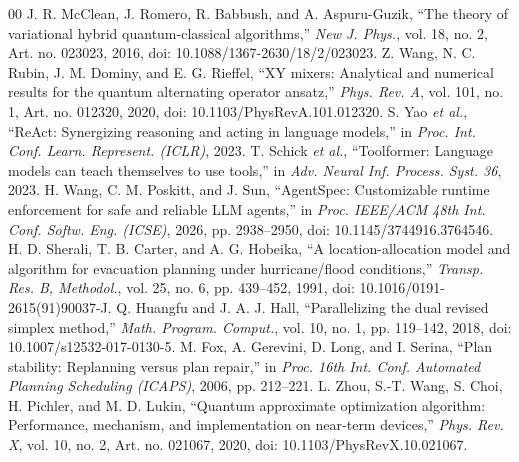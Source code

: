 \documentclass[conference]{IEEEtran}
\begin{document}
\begin{thebibliography}{00}
 J. R. McClean, J. Romero, R. Babbush, and A. Aspuru-Guzik, ``The theory of variational hybrid quantum-classical algorithms,'' \textit{New J. Phys.}, vol. 18, no. 2, Art. no. 023023, 2016, doi: 10.1088/1367-2630/18/2/023023.
 Z. Wang, N. C. Rubin, J. M. Dominy, and E. G. Rieffel, ``XY mixers: Analytical and numerical results for the quantum alternating operator ansatz,'' \textit{Phys. Rev. A}, vol. 101, no. 1, Art. no. 012320, 2020, doi: 10.1103/PhysRevA.101.012320.
 S. Yao \textit{et al.}, ``ReAct: Synergizing reasoning and acting in language models,'' in \textit{Proc. Int. Conf. Learn. Represent. (ICLR)}, 2023.
 T. Schick \textit{et al.}, ``Toolformer: Language models can teach themselves to use tools,'' in \textit{Adv. Neural Inf. Process. Syst. 36}, 2023.
 H. Wang, C. M. Poskitt, and J. Sun, ``AgentSpec: Customizable runtime enforcement for safe and reliable LLM agents,'' in \textit{Proc. IEEE/ACM 48th Int. Conf. Softw. Eng. (ICSE)}, 2026, pp. 2938--2950, doi: 10.1145/3744916.3764546.
 H. D. Sherali, T. B. Carter, and A. G. Hobeika, ``A location-allocation model and algorithm for evacuation planning under hurricane/flood conditions,'' \textit{Transp. Res. B, Methodol.}, vol. 25, no. 6, pp. 439--452, 1991, doi: 10.1016/0191-2615(91)90037-J.
 Q. Huangfu and J. A. J. Hall, ``Parallelizing the dual revised simplex method,'' \textit{Math. Program. Comput.}, vol. 10, no. 1, pp. 119--142, 2018, doi: 10.1007/s12532-017-0130-5.
 M. Fox, A. Gerevini, D. Long, and I. Serina, ``Plan stability: Replanning versus plan repair,'' in \textit{Proc. 16th Int. Conf. Automated Planning Scheduling (ICAPS)}, 2006, pp. 212--221.
 L. Zhou, S.-T. Wang, S. Choi, H. Pichler, and M. D. Lukin, ``Quantum approximate optimization algorithm: Performance, mechanism, and implementation on near-term devices,'' \textit{Phys. Rev. X}, vol. 10, no. 2, Art. no. 021067, 2020, doi: 10.1103/PhysRevX.10.021067.
\end{thebibliography}
\end{document}
